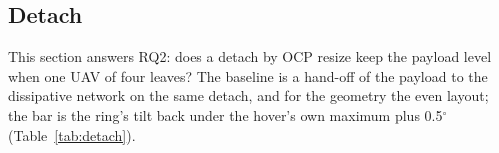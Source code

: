 
\subsection{Detach}
\label{sec:sim_detach}

This section answers RQ2: does a detach by OCP resize keep the payload level when one UAV of four
leaves? The baseline is a hand-off of the payload to the dissipative network on the same detach, and for
the geometry the even layout; the bar is the ring's tilt back under the hover's own maximum plus
0.5$^\circ$ (Table~\ref{tab:detach}).

